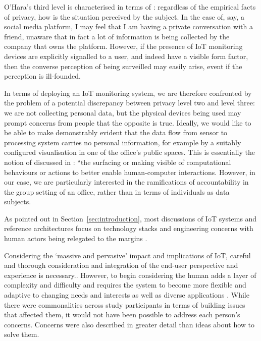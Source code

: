  O'Hara's third level is characterised in terms
of : regardless of the empirical facts of privacy, how is the
situation perceived by the subject. In the case of, say, a social media
platform, I may feel that I am having a private conversation with a
friend, unaware that in fact a lot of information is being collected
by the company that owns the platform. However, if the presence of IoT
monitoring devices are explicitly signalled to a user, and indeed have
a visible form factor, then the converse perception of being
surveilled may easily arise, event if the perception is ill-founded.

In terms of deploying an IoT monitoring system, we are therefore
confronted by the problem of a potential discrepancy between privacy
level two and level three: we are not collecting personal data, but
the physical devices being used may prompt concerns from people that
the opposite is true. Ideally, we would like to be able to make demonstrably
evident that the data flow from sensor to processing system carries no
personal information, for example by a suitably configured
visualisation in one of the office's public spaces. This is essentially the notion of
 discussed in
\cite{Crabtree-2016-BAIT}: ``the surfacing or making visible of
computational behaviours or actions to better enable human-computer
interactions. However, in our case, we are particularly interested in
the ramifications of accountability in the group setting of an office,
rather than in terms of individuals as data subjects.



As pointed out in Section~\ref{sec:introduction}, most discussions of IoT
systems and reference architectures
\cite{Puschel-2016-WIAS,Heidt-2016-PGFT} focus on technology stacks
and engineering concerns with human actors being relegated to the
margins \cite{Shin-2014-ASTF}.

Considering the ‘massive and pervasive’ impact and implications of
IoT, careful and thorough consideration and integration of the
end-user perspective and experience is
necessary.\cite{Ziegler-2017-CIOT}.  However, to begin considering the
human adds a layer of complexity and difficulty and requires the
system to become more flexible and adaptive to changing needs and
interests as well as diverse applications \cite{Shin-2017-UTIO}.
While there were commonalities across study participants in terms of
building issues that affected them, it would not have been possible to
address each person’s concerns. Concerns were also described in
greater detail than ideas about how to solve them.

